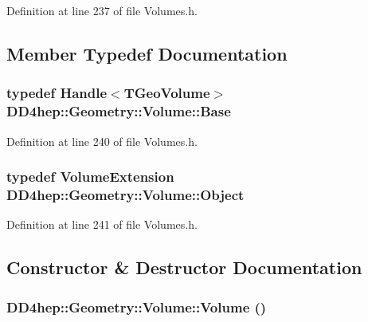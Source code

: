 Definition at line 237 of file Volumes.h.

\subsection{Member Typedef Documentation}
\hypertarget{class_d_d4hep_1_1_geometry_1_1_volume_ac9545eb97e81ed894b7192a26e4ef5a9}{
\subsubsection[{Base}]{\setlength{\rightskip}{0pt plus 5cm}typedef {\bf Handle}$<$TGeoVolume$>$ {\bf DD4hep::Geometry::Volume::Base}}}
\label{class_d_d4hep_1_1_geometry_1_1_volume_ac9545eb97e81ed894b7192a26e4ef5a9}


Definition at line 240 of file Volumes.h.\hypertarget{class_d_d4hep_1_1_geometry_1_1_volume_a12968f95257e99e277f773ccf6d58ee5}{
\subsubsection[{Object}]{\setlength{\rightskip}{0pt plus 5cm}typedef {\bf VolumeExtension} {\bf DD4hep::Geometry::Volume::Object}}}
\label{class_d_d4hep_1_1_geometry_1_1_volume_a12968f95257e99e277f773ccf6d58ee5}


Definition at line 241 of file Volumes.h.

\subsection{Constructor \& Destructor Documentation}
\hypertarget{class_d_d4hep_1_1_geometry_1_1_volume_a5e8cfa8694162b1e3be9401e64667370}{
\subsubsection[{Volume}]{\setlength{\rightskip}{0pt plus 5cm}DD4hep::Geometry::Volume::Volume ()}}
\label{class_d_d4hep_1_1_geometry_1_1_volume_a5e8cfa8694162b1e3be9401e64667370}


